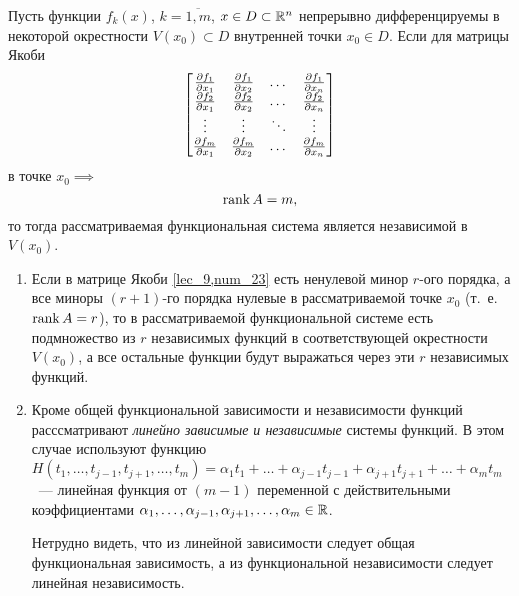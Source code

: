 \documentclass[../main.tex]{subfiles}
\begin{document}
\begin{thm}
	Пусть функции $f_k\left(x\right)$, $k = \overline{1,m}$,
	$x \in D \subset \mathbb{R}^n$ непрерывно дифференцируемы в некоторой 
	окрестности $V(x_0) \subset D$ внутренней точки $x_0 \in D$. Если 
	для матрицы Якоби \begin{equation}
 \label{lec_9,num_23}
 \begin{bmatrix}
        \frac{\partial f_1}{\partial x_1} 
        & \frac{\partial f_1}{\partial x_2} & \dots & 
        \frac{\partial f_1}{\partial x_n} \\
        \frac{\partial f_2}{\partial x_1} & \frac{\partial f_2}{\partial x_2} &\dots & 
        \frac{\partial f_2}{\partial x_n} \\
        \vdots & \vdots & \ddots & \vdots \\
        \frac{\partial f_m}{\partial x_1} & \frac{\partial f_m}{\partial x_2} & \dots & 
        \frac{\partial f_m}{\partial x_n} 
    \end{bmatrix}
\end{equation} в точке $x_0 \implies$ 
	\begin{equation} \label{lec_10, num_24}
		\operatorname{rank} A = m,
	\end{equation}
 	то тогда рассматриваемая функциональная система 
 	является независимой в $V(x_0)$.
\end{thm}
\begin{remarks}

	\begin{enumerate}
		Полученные результаты обощаются в следующем виде:
		
		\item
		Если в матрице Якоби \eqref{lec_9,num_23} есть ненулевой 
		минор $r$-ого порядка, а все миноры $(r+1)$-го 
		порядка нулевые 
		в рассматриваемой точке $x_0$ (т.~е. $\operatorname{rank} A = r$), то в 
		рассматриваемой функциональной системе есть подмножество 
		из $r$ независимых функций в соответствующей окрестности 
		$V(x_0)$, а все остальные функции будут выражаться через 
		эти $r$ независимых функций.
		
		\item
		Кроме общей функциональной зависимости и независимости 
		функций расссматривают \emph{линейно зависимые и независимые} 
		системы функций. В этом случае используют функцию 
		$H( t_1, \ldots, t_{j-1}, t_{j+1}, \ldots, t_m 
		) = \alpha_1 t_1 + \ldots + \alpha_{j-1} t_{j-1} + 
		\alpha_{j+1} t_{j+1} + \ldots + \alpha_m t_m$~--- 
		линейная функция от $(m-1)$ переменной с действительными 
		коэффициентами $\alpha_1, \ldots, \alpha_{j-1}, 
		\alpha_{j+1}, \ldots, \alpha_m \in \mathbb{R}$.
	
		Нетрудно видеть, что из линейной зависимости следует 
		общая функциональная зависимость, а из функциональной 
		независимости следует линейная независимость.
	\end{enumerate}
\end{remarks}
\end{document}
